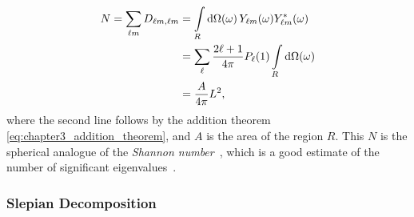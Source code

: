 %
\begin{align}\label{eq:chapter3_shannon}
	N
	= \sum\limits_{\ell m} D_{\ell m,\ell m}
	 & = \int\limits_{R} \dd{\Omega(\omega)} {Y}_{\ell m}(\omega) {Y}_{\ell m}^{\ast}(\omega) \nonumber \\
	 & = \sum\limits_{\ell} \frac{2\ell+1}{4\pi} P_{\ell}(1) \int\limits_{R} \dd{\Omega(\omega)} \nonumber           \\
	 & = \frac{A}{4\pi} L^{2},
\end{align}
%
where the second line follows by the addition theorem \cref{eq:chapter3_addition_theorem}, and \(A\) is the area of the region \(R\).
This \(N\) is the spherical analogue of the \emph{Shannon number}~\cite{Simons2006}, which is a good estimate of the number of significant eigenvalues~\cite{Donoho1989}.

\subsubsection{Slepian Decomposition}

